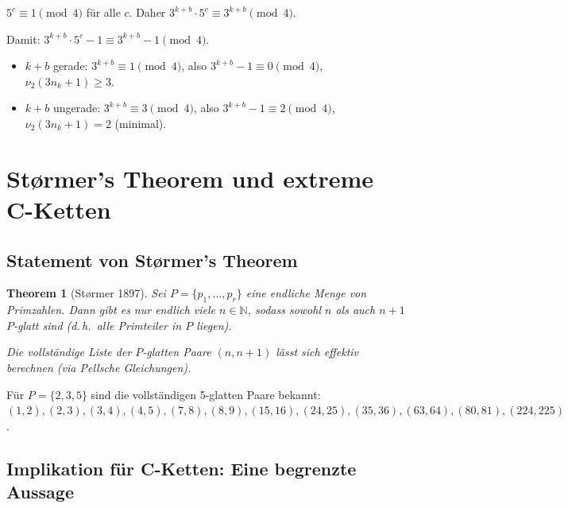 \documentclass[12pt,a4paper]{article}
\newtheorem{theorem}[definition]{Theorem}
\newcommand{\vii}{\nu_2}
\newcommand{\N}{\mathbb{N}}
\begin{document}
	$5^c \equiv 1 \pmod 4$ für alle $c$. Daher $3^{k+b} \cdot 5^c \equiv 3^{k+b} \pmod 4$.
	
	Damit: $3^{k+b} \cdot 5^c - 1 \equiv 3^{k+b} - 1 \pmod 4$.
	\begin{itemize}
		\item $k+b$ gerade: $3^{k+b} \equiv 1 \pmod 4$, also $3^{k+b}-1 \equiv 0 \pmod 4$,
		$\vii(3n_k+1) \geq 3$.
		\item $k+b$ ungerade: $3^{k+b} \equiv 3 \pmod 4$, also $3^{k+b}-1 \equiv 2 \pmod 4$,
		$\vii(3n_k+1) = 2$ (minimal).
	\end{itemize}
	
	\section{Størmer's Theorem und extreme C-Ketten}
	\label{sec:stoermer}
	
	\subsection{Statement von Størmer's Theorem}
	
	\begin{theorem}[Størmer 1897]
		\label{thm:stoermer}
		Sei $P = \{p_1, \ldots, p_r\}$ eine endliche Menge von Primzahlen.
		Dann gibt es nur endlich viele $n \in \N$, sodass sowohl $n$ als auch $n+1$
		$P$-glatt sind (d.\,h.\ alle Primteiler in $P$ liegen).
		
		Die vollständige Liste der $P$-glatten Paare $(n, n+1)$ lässt sich effektiv
		berechnen (via Pellsche Gleichungen).
	\end{theorem}
	
	Für $P = \{2, 3, 5\}$ sind die vollständigen 5-glatten Paare bekannt:
	$(1,2), (2,3), (3,4), (4,5), (7,8), (8,9), (15,16), (24,25), (35,36), (63,64), (80,81), (224,225)$.
	
	\subsection{Implikation für C-Ketten: Eine begrenzte Aussage}
	
\end{document}
